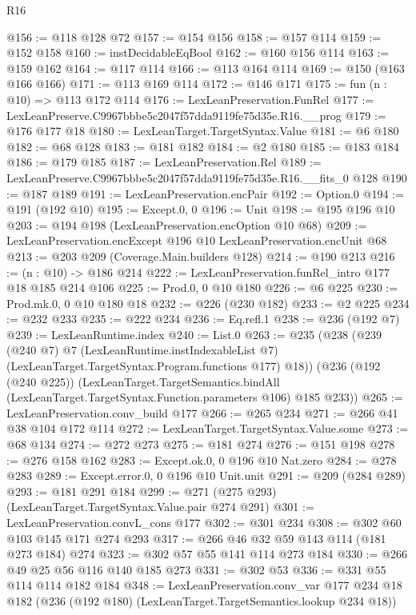 \begin{lexlean}{R16}
\begin{coremodule}
@156 := @118 @128 @72
@157 := @154 @156
@158 := @157 @114
@159 := @152 @158
@160 := instDecidableEqBool
@162 := @160 @156 @114
@163 := @159 @162
@164 := @117 @114
@166 := @113 @164 @114
@169 := @150 (@163 @166 @166)
@171 := @113 @169 @114
@172 := @146 @171
@175 := fun (n : @10) => @113 @172 @114
@176 := LexLeanPreservation.FunRel
@177 := LexLeanPreserve.C9967bbbe5c2047f57dda9119fe75d35e.R16.__prog
@179 := @176 @177 @18
@180 := LexLeanTarget.TargetSyntax.Value
@181 := @6 @180
@182 := @68 @128
@183 := @181 @182
@184 := @2 @180
@185 := @183 @184
@186 := @179 @185
@187 := LexLeanPreservation.Rel
@189 := LexLeanPreserve.C9967bbbe5c2047f57dda9119fe75d35e.R16.__fits_0 @128
@190 := @187 @189
@191 := LexLeanPreservation.encPair
@192 := Option.{0}
@194 := @191 (@192 @10)
@195 := Except.{0, 0}
@196 := Unit
@198 := @195 @196 @10
@203 := @194 @198 (LexLeanPreservation.encOption @10 @68)
@209 := LexLeanPreservation.encExcept @196 @10 LexLeanPreservation.encUnit @68
@213 := @203 @209 (Coverage.Main.builders @128)
@214 := @190 @213
@216 := (n : @10) -> @186 @214
@222 := LexLeanPreservation.funRel_intro @177 @18 @185 @214 @106
@225 := Prod.{0, 0} @10 @180
@226 := @6 @225
@230 := Prod.mk.{0, 0} @10 @180 @18
@232 := @226 (@230 @182)
@233 := @2 @225
@234 := @232 @233
@235 := @222 @234
@236 := Eq.refl.{1}
@238 := @236 (@192 @7)
@239 := LexLeanRuntime.index
@240 := List.{0}
@263 := @235
    (@238
      (@239
        (@240 @7)
        @7
        (LexLeanRuntime.instIndexableList @7)
        (LexLeanTarget.TargetSyntax.Program.functions @177)
        @18))
    (@236
      (@192 (@240 @225))
      (LexLeanTarget.TargetSemantics.bindAll
        (LexLeanTarget.TargetSyntax.Function.parameters @106)
        @185
        @233))
@265 := LexLeanPreservation.conv_build @177
@266 := @265 @234
@271 := @266 @41 @38 @104 @172 @114
@272 := LexLeanTarget.TargetSyntax.Value.some
@273 := @68 @134
@274 := @272 @273
@275 := @181 @274
@276 := @151 @198
@278 := @276 @158 @162
@283 := Except.ok.{0, 0} @196 @10 Nat.zero
@284 := @278 @283
@289 := Except.error.{0, 0} @196 @10 Unit.unit
@291 := @209 (@284 @289)
@293 := @181 @291 @184
@299 := @271 (@275 @293) (LexLeanTarget.TargetSyntax.Value.pair @274 @291)
@301 := LexLeanPreservation.convL_cons @177
@302 := @301 @234
@308 := @302 @60 @103 @145 @171 @274 @293
@317 := @266 @46 @32 @59 @143 @114 (@181 @273 @184) @274
@323 := @302 @57 @55 @141 @114 @273 @184
@330 := @266 @49 @25 @56 @116 @140 @185 @273
@331 := @302 @53
@336 := @331 @55 @114 @114 @182 @184
@348 := LexLeanPreservation.conv_var
    @177
    @234
    @18
    @182
    (@236 (@192 @180) (LexLeanTarget.TargetSemantics.lookup @234 @18))

\end{coremodule}
\end{lexlean}
